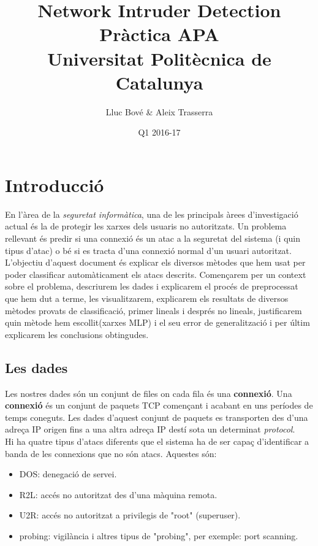 \documentclass[a4paper]{article} %
\title{Network Intruder Detection \\
\large Pràctica APA \\
Universitat Politècnica de Catalunya} %
\author{Lluc Bové \& Aleix Trasserra} %
\date{Q1 2016-17}
\begin{document}
\maketitle %
\newpage
\tableofcontents
\newpage

\section{Introducció}
En l'àrea de la \textit{seguretat informàtica}, una de les principals àrees d'investigació actual és la de protegir les xarxes dels usuaris no autoritzats.
Un problema rellevant és predir si una connexió és un atac a la seguretat del sistema (i quin tipus d'atac) o bé si es tracta d'una connexió normal d'un usuari autoritzat.
L'objectiu d'aquest document és explicar els diversos mètodes que hem usat per poder classificar automàticament els atacs descrits. Començarem per un context sobre el problema, descriurem les dades i explicarem el procés de preprocessat que hem dut a terme, les visualitzarem, explicarem els resultats de diversos mètodes provats de classificació, primer lineals i després no lineals, justificarem quin mètode hem escollit(xarxes MLP) i el seu error de generalització i per últim explicarem les conclusions obtingudes.

\subsection{Les dades}
Les nostres dades\cite{kdd} són un conjunt de files on cada fila és una \textbf{connexió}.
Una \textbf{connexió} és un conjunt de paquets TCP començant i acabant en uns períodes de temps coneguts. Les dades d'aquest conjunt de paquets es transporten des d'una adreça IP origen fins a una altra adreça IP destí sota un determinat \textit{protocol}. \\
Hi ha quatre tipus d'atacs diferents que el sistema ha de ser capaç d'identificar a banda de les connexions que no són atacs. Aquestes són:
\begin{itemize}
	\item DOS: denegació de servei.
	\item R2L: accés no autoritzat des d'una màquina remota.
	\item U2R: accés no autoritzat a privilegis de "root" (superuser).
	\item probing: vigilància i altres tipus de  "probing", per exemple: port scanning.
\end{itemize}
\end{document}
